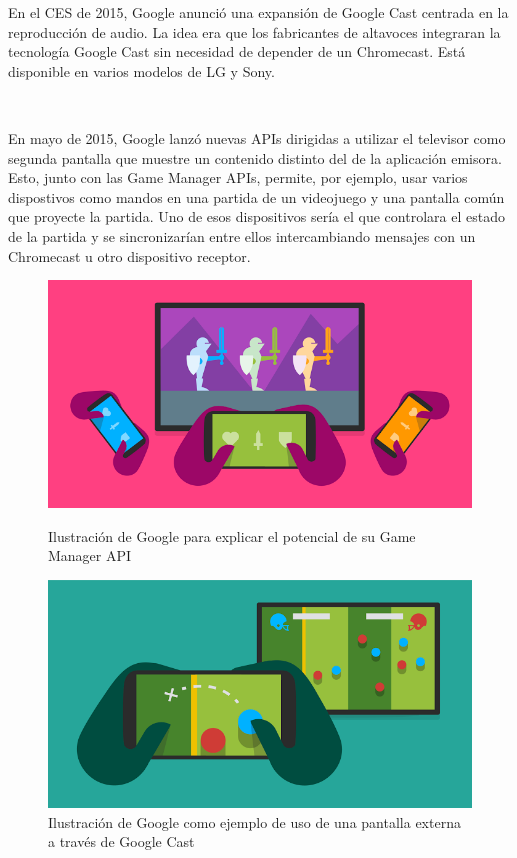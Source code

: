 En el CES de 2015, Google anunció una expansión de Google Cast centrada en la reproducción de audio.
La idea era que los fabricantes de altavoces integraran la tecnología Google Cast sin necesidad de depender de un Chromecast.
Está disponible en varios modelos de LG y Sony.

\

En mayo de 2015, Google lanzó nuevas APIs dirigidas a utilizar el televisor como segunda pantalla que muestre un contenido distinto del de la aplicación emisora.
Esto, junto con las Game Manager APIs, permite, por ejemplo, usar varios dispostivos como mandos en una partida de un videojuego y una pantalla común que proyecte la partida.
Uno de esos dispositivos sería el que controlara el estado de la partida y se sincronizarían entre ellos intercambiando mensajes con un Chromecast u otro dispositivo receptor.

\begin{figure}[H]
	\centering
	\begin{minipage}[b]{.35\textwidth}
		\includegraphics[scale=0.3]{./Imagenes/games.png}
		\caption{Ilustración de Google para explicar el potencial de su Game Manager API}\label{fig:games}
	\end{minipage}\qquad
	\hspace{2cm}
	\begin{minipage}[b]{.35\textwidth}
		\includegraphics[scale=0.3]{./Imagenes/seconddisplay.png}
		\caption{Ilustración de Google como ejemplo de uso de una pantalla externa a través de Google Cast}\label{fig:seconddisplay}
	\end{minipage}
\end{figure}

